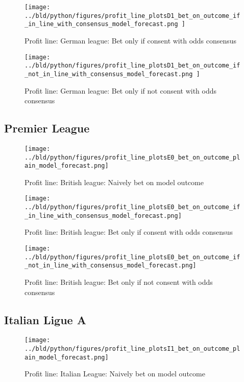 \documentclass[11pt, a4paper, leqno]{article}
\begin{document}
\begin{figure}[H]
    \centering
    \texttt{[image: ../bld/python/figures/profit\_line\_plotsD1\_bet\_on\_outcome\_if\_in\_line\_with\_consensus\_model\_forecast.png
    ]}
    \caption{Profit line: German league: Bet only if consent with odds consensus}
    \label{fig:figure2}
\end{figure}
\begin{figure}[H]
    \centering
    \texttt{[image: ../bld/python/figures/profit\_line\_plotsD1\_bet\_on\_outcome\_if\_not\_in\_line\_with\_consensus\_model\_forecast.png
    ]}
    \caption{Profit line: German league: Bet only if not consent with odds consensus}
    \label{fig:figure2}
\end{figure}




\subsection{Premier League}
\begin{figure}[H]
    \centering
    \texttt{[image: ../bld/python/figures/profit\_line\_plotsE0\_bet\_on\_outcome\_plain\_model\_forecast.png]}
    \caption{Profit line: British league: Naively bet on model outcome}
    \label{fig:figure2}
\end{figure}

\begin{figure}[H]
    \centering
    \texttt{[image: ../bld/python/figures/profit\_line\_plotsE0\_bet\_on\_outcome\_if\_in\_line\_with\_consensus\_model\_forecast.png]}
    \caption{Profit line: British league: Bet only if consent with odds consensus}
    \label{fig:figure2}
\end{figure}
\begin{figure}[H]
    \centering
    \texttt{[image: ../bld/python/figures/profit\_line\_plotsE0\_bet\_on\_outcome\_if\_not\_in\_line\_with\_consensus\_model\_forecast.png]}
    \caption{Profit line: British league: Bet only if not consent with odds consensus}
    \label{fig:figure2}
\end{figure}





\subsection{Italian Ligue A}
\begin{figure}[H]
    \centering
    \texttt{[image: ../bld/python/figures/profit\_line\_plotsI1\_bet\_on\_outcome\_plain\_model\_forecast.png]}
    \caption{Profit line: Italian League: Naively bet on model outcome}
    \label{fig:figure2}
\end{figure}
\end{document}
